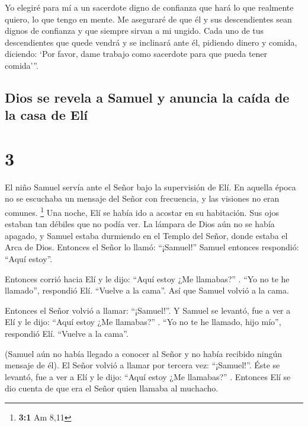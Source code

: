  Yo elegiré para mí a un sacerdote digno de confianza que
hará lo que realmente quiero, lo que tengo en mente. Me aseguraré de que
él y sus descendientes sean dignos de confianza y que siempre sirvan a
mi ungido.  Cada uno de tus descendientes que quede
vendrá y se inclinará ante él, pidiendo dinero y comida, diciendo: `Por
favor, dame trabajo como sacerdote para que pueda tener comida'''.

\hypertarget{dios-se-revela-a-samuel-y-anuncia-la-cauxedda-de-la-casa-de-eluxed}{%
\subsection{Dios se revela a Samuel y anuncia la caída de la casa de
Elí}\label{dios-se-revela-a-samuel-y-anuncia-la-cauxedda-de-la-casa-de-eluxed}}

\hypertarget{section-2}{%
\section{3}\label{section-2}}

 El niño Samuel servía ante el Señor bajo la supervisión
de Elí. En aquella época no se escuchaba un mensaje del Señor con
frecuencia, y las visiones no eran comunes. \footnote{\textbf{3:1} Am
  8,11}  Una noche, Elí se había ido a acostar en su
habitación. Sus ojos estaban tan débiles que no podía ver.
 La lámpara de Dios aún no se había apagado, y Samuel
estaba durmiendo en el Templo del Señor, donde estaba el Arca de Dios.
 Entonces el Señor lo llamó: ``¡Samuel!'' Samuel entonces
respondió: ``Aquí estoy''.

 Entonces corrió hacia Elí y le dijo: ``Aquí estoy ¿Me
llamabas?'' . ``Yo no te he llamado'', respondió Elí. ``Vuelve a la
cama''. Así que Samuel volvió a la cama.

 Entonces el Señor volvió a llamar: ``¡Samuel!''. Y Samuel
se levantó, fue a ver a Elí y le dijo: ``Aquí estoy ¿Me llamabas?'' .
``Yo no te he llamado, hijo mío'', respondió Elí. ``Vuelve a la cama''.

 (Samuel aún no había llegado a conocer al Señor y no
había recibido ningún mensaje de él).  El Señor volvió a
llamar por tercera vez: ``¡Samuel!''. Éste se levantó, fue a ver a Elí y
le dijo: ``Aquí estoy ¿Me llamabas?'' . Entonces Elí se dio cuenta de
que era el Señor quien llamaba al muchacho.

